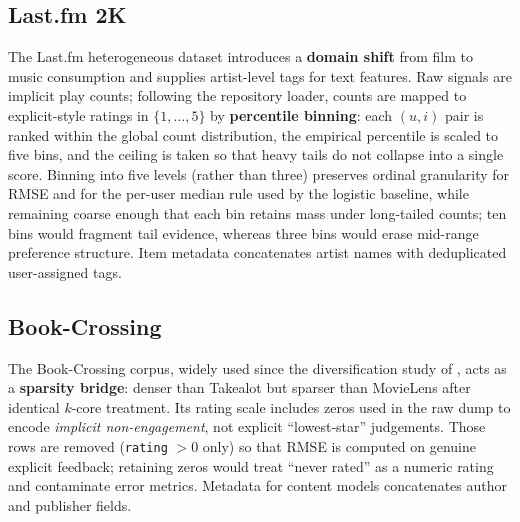 \subsection{Last.fm 2K}
The Last.fm heterogeneous dataset \citep{cantador2011second} introduces a \textbf{domain shift} from film to music consumption and supplies artist-level tags for text features. Raw signals are implicit play counts; following the repository loader, counts are mapped to explicit-style ratings in $\{1,\ldots,5\}$ by \textbf{percentile binning}: each $(u,i)$ pair is ranked within the global count distribution, the empirical percentile is scaled to five bins, and the ceiling is taken so that heavy tails do not collapse into a single score. Binning into five levels (rather than three) preserves ordinal granularity for RMSE and for the per-user median rule used by the logistic baseline, while remaining coarse enough that each bin retains mass under long-tailed counts; ten bins would fragment tail evidence, whereas three bins would erase mid-range preference structure. Item metadata concatenates artist names with deduplicated user-assigned tags.

\subsection{Book-Crossing}
The Book-Crossing corpus, widely used since the diversification study of \citet{ziegler2005improving}, acts as a \textbf{sparsity bridge}: denser than Takealot but sparser than MovieLens after identical $k$-core treatment. Its rating scale includes zeros used in the raw dump to encode \emph{implicit non-engagement}, not explicit ``lowest-star'' judgements. Those rows are removed (\texttt{rating} $>0$ only) so that RMSE is computed on genuine explicit feedback; retaining zeros would treat ``never rated'' as a numeric rating and contaminate error metrics. Metadata for content models concatenates author and publisher fields.

